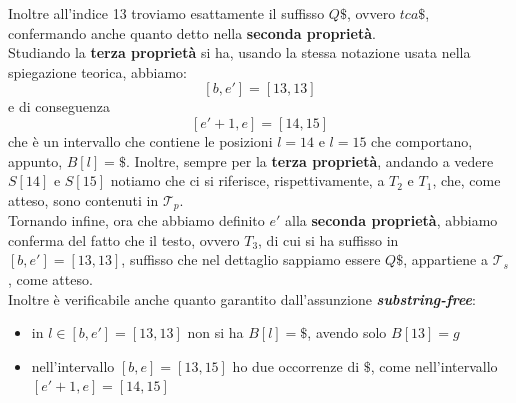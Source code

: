 \documentclass[a4paper,12pt, oneside]{book}
\begin{document}
\begin{esempio}
  Inoltre all'indice 13 troviamo esattamente il suffisso $Q\$$,
  ovvero $tca\$$, confermando anche quanto detto nella \textbf{seconda
  proprietà}.\\ 
  Studiando la \textbf{terza proprietà} si ha,
  usando la stessa notazione usata nella spiegazione teorica, abbiamo:
  \[[b,e']=[13,13]\]
  e di conseguenza
  \[[e'+1, e]=[14,15]\]
  che è un intervallo che contiene le posizioni $l=14$ e $l=15$ che comportano,
  appunto, $B[l]=\$$. Inoltre, sempre per la \textbf{terza proprietà}, andando a
  vedere 
  $S[14]$ e $S[15]$ notiamo che ci si riferisce, rispettivamente, a $T_2$ e
  $T_1$, che, come atteso, sono contenuti in $\mathcal{T}_p$.\\ 
  Tornando infine, ora che abbiamo definito $e'$ alla \textbf{seconda
    proprietà}, abbiamo conferma del fatto che il testo, ovvero $T_3$, di cui si
  ha suffisso in $[b,e']=[13,13]$, suffisso che nel dettaglio sappiamo essere
  $Q\$$, appartiene a $\mathcal{T}_s$, come atteso.\\
  Inoltre è verificabile anche quanto garantito dall'assunzione
  \textbf{\textit{substring-free}}:
  \begin{itemize}
    \item in $l\in[b,e']=[13,13]$ non si ha $B[l]=\$$, avendo solo $B[13]=g$
    \item nell'intervallo $[b,e]=[13,15]$ ho due occorrenze di $\$$,
    come nell'intervallo $[e'+1, e]=[14,15]$
  \end{itemize}
\end{esempio}
\end{document}
